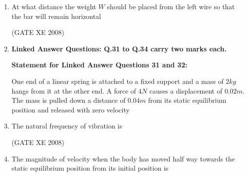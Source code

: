 \documentclass[12pt]{article}
\begin{document}
\begin{enumerate}
(GATE XE 2008)

\item At what distance the weight $W$ should be placed from the left wire so that the bar will remain horizontal  

\begin{enumerate}
\end{enumerate}

(GATE XE 2008)

\item[] \textbf{\Large Linked Answer Questions: Q.31 to Q.34 carry two marks each.}

\textbf{Statement for Linked Answer Questions 31 and 32:}

One end of a linear spring is attached to a fixed support and a mass of $2 kg$ hangs from it at the other end. A force of $4 N$ causes a displacement of $0.02m$. The mass is pulled down a distance of $0.04 m$ from its static equilibrium position and released with zero velocity


\item The natural frequency of vibration is  

\begin{enumerate}
\end{enumerate}

(GATE XE 2008)

\item The magnitude of velocity when the body has moved half way towards the static equilibrium position from its initial position is  

\begin{enumerate}
\end{enumerate}


\end{enumerate}
\end{document}
